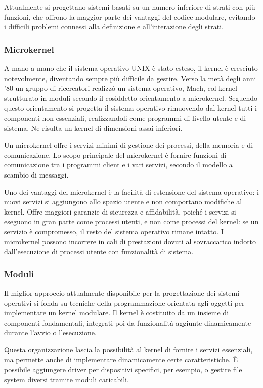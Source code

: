 \documentclass[11pt,a4paper]{article}
\begin{document}
Attualmente si progettano sistemi basati su un numero inferiore di
strati con più funzioni, che offrono la maggior parte dei vantaggi del codice modulare, evi­tando i difficili problemi connessi alla definizione e all'interazione degli strati.

\subsubsection{Microkernel}
A mano a mano che il sistema operativo UNIX è stato esteso, il kernel è cresciuto notevol­mente, diventando sempre più diffìcile da gestire. Verso la metà degli anni '80 un gruppo di
ricercatori realizzò un sistema operativo, Mach,
col kernel strutturato in moduli secondo il cosiddetto orientamento a microkernel. Seguen­do questo orientamento si progetta il sistema operativo rimuovendo dal kernel tutti i com­ponenti non essenziali, realizzandoli come programmi di livello utente e di sistema. Ne ri­sulta un kernel di dimensioni assai inferiori.

Un microkernel offre i servizi minimi di gestione dei processi, della memoria e di
comunicazione.
Lo scopo principale del microkernel è fornire funzioni di comunicazione tra i pro­grammi client e i vari servizi, secondo il modello a scambio di messaggi.

Uno dei vantaggi del microkernel è la facilità di estensione del sistema operativo: i
nuovi servizi si aggiungono allo spazio utente e non comportano modifiche al kernel.
Offre maggiori garanzie di sicurezza e affidabilità, poiché i servizi si eseguono
in gran parte come processi utenti, e non come processi del kernel: se un servizio è compro­messo, il resto del sistema operativo rimane intatto.
I microkernel possono incorrere in cali di prestazioni dovuti al sovraccarico
indotto dall'esecuzione di processi utente con funzionalità di sistema.

\subsubsection{Moduli}
Il miglior approccio attualmente disponibile per la progettazione dei sistemi operativi
si fonda su tecniche della programmazione orientata agli oggetti per implementare un ker­nel modulare.
Il kernel è costituito da un insieme di componenti fondamentali, integrati poi da funzionalità aggiunte dinamicamente durante l'avvio o l'esecuzio­ne.

Questa organizzazione lascia la possibilità al kernel di fornire i servizi essenziali, ma permet­te anche di implementare dinamicamente certe caratteristiche. È possibile aggiungere driver
per dispositivi specifici, per esempio, o gestire file system diversi tramite moduli caricabili.
\end{document}
